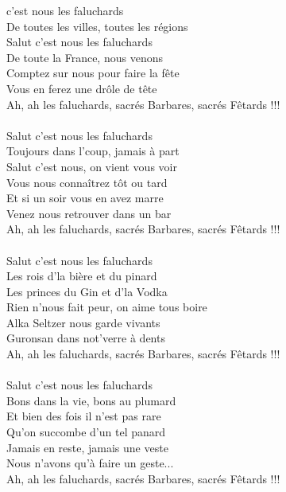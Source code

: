 
 c'est nous les faluchards
\\De toutes les villes, toutes les régions
\\Salut c'est nous les faluchards
\\De toute la France, nous venons
\\Comptez sur nous pour faire la fête
\\Vous en ferez une drôle de tête
\\Ah, ah les faluchards, sacrés Barbares, sacrés Fêtards !!!
\\\\Salut c'est nous les faluchards
\\Toujours dans l'coup, jamais à part
\\Salut c'est nous, on vient vous voir
\\Vous nous connaîtrez tôt ou tard
\\Et si un soir vous en avez marre
\\Venez nous retrouver dans un bar
\\Ah, ah les faluchards, sacrés Barbares, sacrés Fêtards !!!
\\\\Salut c'est nous les faluchards
\\Les rois d'la bière et du pinard
\\Les princes du Gin et d'la Vodka
\\Rien n'nous fait peur, on aime tous boire
\\Alka Seltzer nous garde vivants
\\Guronsan dans not'verre à dents
\\Ah, ah les faluchards, sacrés Barbares, sacrés Fêtards !!!
\\\\Salut c'est nous les faluchards
\\Bons dans la vie, bons au plumard
\\Et bien des fois il n'est pas rare
\\Qu'on succombe d'un tel panard
\\Jamais en reste, jamais une veste
\\Nous n'avons qu'à faire un geste...
\\Ah, ah les faluchards, sacrés Barbares, sacrés Fêtards !!!
